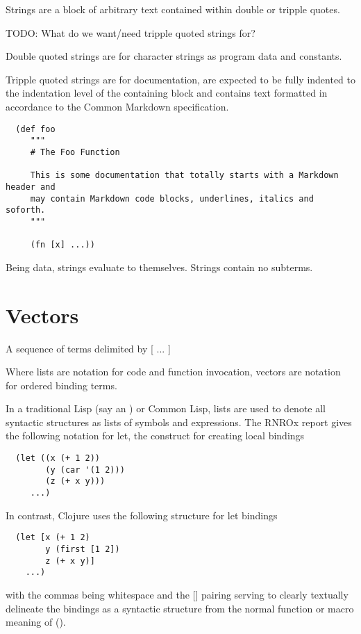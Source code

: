 \documentclass{report}
\def\rnrs{RNROx }
\begin{document}
Strings are a block of arbitrary text contained within double or tripple quotes.

TODO: What do we want/need tripple quoted strings for?

Double quoted strings are for character strings as program data and constants.

Tripple quoted strings are for documentation, are expected to be fully
indented to the indentation level of the containing block and contains text
formatted in accordance to the Common Markdown specification.

\begin{lstlisting}
  (def foo
     """
     # The Foo Function
   
     This is some documentation that totally starts with a Markdown header and
     may contain Markdown code blocks, underlines, italics and soforth.
     """
   
     (fn [x] ...))
\end{lstlisting}

Being data, strings evaluate to themselves. Strings contain no subterms.

\section{Vectors}


A sequence of terms delimited by [ ... ]

Where lists are notation for code and function invocation, vectors are
notation for ordered binding terms.

In a traditional Lisp (say an ) or Common Lisp, lists are used to
denote all syntactic structures as lists of symbols and expressions. The
\rnrs report gives the following notation for let, the construct for
creating local bindings

\begin{lstlisting}
  (let ((x (+ 1 2))
        (y (car '(1 2)))
        (z (+ x y)))
     ...)
\end{lstlisting}

In contrast, Clojure uses the following structure for let bindings

\begin{lstlisting}
  (let [x (+ 1 2)
        y (first [1 2])
        z (+ x y)]
    ...)
\end{lstlisting}

with the commas being whitespace and the [] pairing serving to clearly
textually delineate the bindings as a syntactic structure from the normal
function or macro meaning of ().
\end{document}
